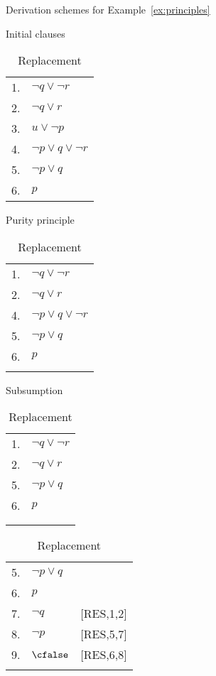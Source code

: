 \begin{example}
    \begin{table}
        \caption{Derivation schemes for Example~\ref{ex:principles}}
        \centering
       \begin{subtable}{.20\textwidth}
           \caption{Initial clauses}
           \begin{tabular}{rl}
               1. & $\neg q \lor \neg r$ \\
               2. & $\neg q \lor r$ \\
               3. & $u \lor \neg p$ \\
               4. & $\neg p \lor q \lor \neg r$ \\
               5. & $\neg p \lor q$ \\
               6. & $p$
           \end{tabular}%
           \label{tab:resa}
       \end{subtable} 
       \begin{subtable}{.21\textwidth}
           \caption{Purity principle}
           \begin{tabular}{rl}
               1. & $\neg q \lor \neg r$ \\
               2. & $\neg q \lor r$ \\
               4. & $\neg p \lor q \lor \neg r$ \\
               5. & $\neg p \lor q$ \\
               6. & $p$ \\
                  & 
           \end{tabular}%
           \label{tab:resb}
       \end{subtable} 
       \begin{subtable}{.19\textwidth}
           \caption{Subsumption}
           \begin{tabular}{rl}
               1. & $\neg q \lor \neg r$ \\
               2. & $\neg q \lor r$ \\
               5. & $\neg p \lor q$ \\
               6. & $p$ \\
                  & \\
                  &
           \end{tabular}%
           \label{tab:resc}
       \end{subtable} 
       \begin{subtable}{.24\textwidth}
           \caption{Replacement}
           \begin{tabular}{rll}
               5. & $\neg p \lor q$ \\
               6. & $p$ \\
               7. & $\neg q$ & [RES,1,2] \\
               8. & $\neg p$ & [RES,5,7] \\
               9.& $\cfalse$ & [RES,6,8] \\
                  &
           \end{tabular}%
           \label{tab:resd}
       \end{subtable} 
    \end{table}%
\label{ex:principles}
\end{example}

